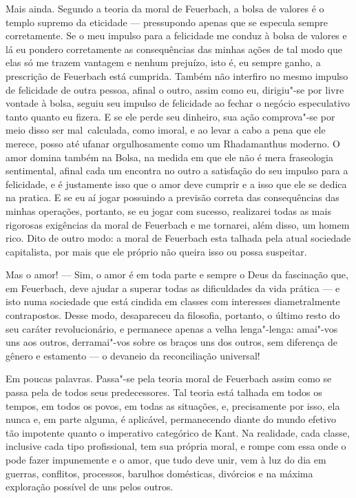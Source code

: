 Mais ainda. Segundo a teoria da moral
de Feuerbach,
a bolsa de valores é o templo supremo da eticidade --- 
pressupondo apenas que se especula sempre corretamente. Se o meu impulso
para a felicidade me conduz à bolsa de valores e lá eu pondero
corretamente as consequências das minhas ações de tal modo que elas só
me trazem vantagem e nenhum prejuízo, isto é, eu sempre ganho, a
prescrição
de Feuerbach está
cumprida. Também não interfiro no mesmo impulso de felicidade de outra
pessoa, afinal o outro, assim como eu, dirigiu"-se por livre vontade à
bolsa, seguiu seu impulso de felicidade ao fechar o negócio especulativo
tanto quanto eu fizera. E se ele perde seu dinheiro, sua ação
comprova"-se por meio disso ser mal\est\ calculada, como imoral,
e ao levar a cabo a pena que ele merece, posso até
ufanar orgulhosamente como um Rhadamanthus moderno. O amor domina também
na Bolsa, na medida em que ele não é mera fraseologia sentimental,
afinal cada um encontra no outro a satisfação do seu impulso para a
felicidade, e é justamente isso que o amor deve cumprir e a isso que ele
se dedica na pratica. E se eu aí jogar possuindo a previsão correta das
consequências das minhas operações, portanto, se eu jogar com sucesso,
realizarei todas as mais rigorosas exigências da moral
de Feuerbach e
me tornarei, além disso, um homem rico. \textbar{} Dito de outro modo: a moral
de Feuerbach esta
talhada pela atual sociedade capitalista, por mais que ele próprio não
queira isso ou possa suspeitar.\textbar{}

Mas o amor! --- Sim, o amor é em toda parte e sempre o Deus da fascinação
que,
em Feuerbach,
deve ajudar a superar todas as dificuldades da vida prática --- e isto
numa sociedade que está cindida em classes com interesses diametralmente
contrapostos. Desse modo, desapareceu da filosofia, portanto, o último
resto do seu caráter revolucionário, e permanece apenas a velha
lenga"-lenga: amai"-vos uns aos outros, derramai"-vos sobre os braços uns
dos outros, sem diferença de gênero e estamento --- o devaneio da
reconciliação universal!

Em poucas palavras. Passa"-se pela teoria moral
de Feuerbach
assim como se passa pela de todos seus predecessores. Tal teoria está
talhada em todos os tempos, em todos os povos, em todas as situações, e,
precisamente por isso, ela nunca e, em parte alguma, é aplicável,
permanecendo diante do mundo efetivo tão impotente quanto o imperativo
categórico
de Kant.
Na realidade, cada classe, inclusive cada tipo profissional, tem sua
própria moral, e rompe com essa onde o pode fazer impunemente e o amor,
que tudo deve unir, vem à luz do dia em guerras, conflitos, processos,
barulhos domésticas, divórcios e na máxima exploração possível de uns
pelos outros.

